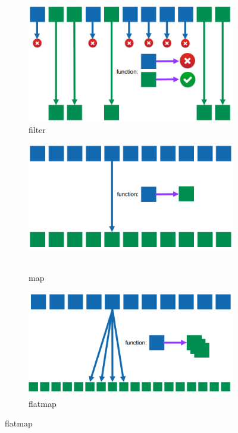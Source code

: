 \documentclass[11pt,oneside,a4paper]{article}
\begin{document}
\begin{figure}[t!]
	\centering
	\begin{subfigure}[t]{.3\textwidth}
		\centering
		\includegraphics[width=0.7\linewidth]{figures/spark_filter}
		\caption{filter}
	\end{subfigure}%
	\begin{subfigure}[t]{.3\textwidth}
		\centering
		\includegraphics[width=0.7\linewidth]{figures/spark_map}\
		\caption{map}
	\end{subfigure}
	\begin{subfigure}[t]{.3\textwidth}
		\centering
		\includegraphics[width=0.7\linewidth]{figures/spark_flatmap}
		\caption{flatmap}
	\end{subfigure}
\end{figure}
\end{document}
